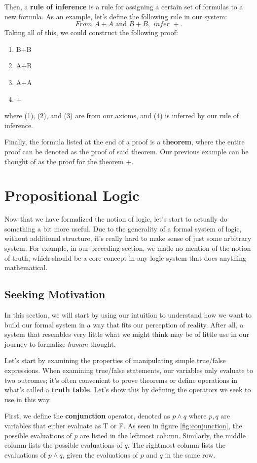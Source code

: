 Then, a \textbf{rule of inference} is a rule for assigning a certain set of formulas to a new formula.
As an example, let's define the following rule in our system:
$$\textit{From } A+A \text{ and } B+B, \textit{ infer } +.$$
Taking all of this, we could construct the following proof:
\begin{enumerate}[label=(\arabic*)]
	\item B+B
	\item A+B
	\item A+A
	\item +
\end{enumerate}
where (1), (2), and (3) are from our axioms, and (4) is inferred by our rule of inference.

Finally, the formula listed at the end of a proof is a \textbf{theorem}, where the entire proof can be denoted as the proof of said theorem.
Our previous example can be thought of as the proof for the theorem $+$.

\section{Propositional Logic}
Now that we have formalized the notion of logic, let's start to actually do something a bit more useful.
Due to the generality of a formal system of logic, without additional structure, it's really hard to make sense of just some arbitrary system.
For example, in our preceding section, we made no mention of the notion of truth, which should be a core concept in any logic system that does anything mathematical.

\subsection{Seeking Motivation}
In this section, we will start by using our intuition to understand how we want to build our formal system in a way that fits our perception of reality.
After all, a system that resembles very little what we might think may be of little use in our journey to formalize \textit{human} thought.

Let's start by examining the properties of manipulating simple true/false expressions.
When examining true/false statements, our variables only evaluate to two outcomes; it's often convenient to prove theorems or define operations in what's called a \textbf{truth table}.
Let's show this by defining the operators we seek to use in this way.

First, we define the \textbf{conjunction} operator, denoted as $p\wedge q$ where $p,q$ are variables that either evaluate as T or F. As seen in figure \eqref{fig:conjunction}, the possible evaluations of $p$ are listed in the leftmost column.
Similarly, the middle column lists the possible evaluations of $q$.
The rightmost column lists the evaluations of $p\wedge q$, given the evaluations of $p$ and $q$ in the same row.

